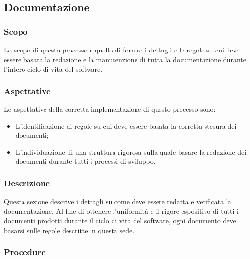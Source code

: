 \documentclass[../norme-di-progetto.tex]{subfiles}
\begin{document}
\subsection{Documentazione}
\subsubsection{Scopo}
Lo scopo di questo processo è quello di fornire i dettagli e le regole su cui deve essere basata la redazione e la manutenzione di tutta la documentazione durante l'intero ciclo di vita del software.
\subsubsection{Aspettative}
Le aspettative della corretta implementazione di questo processo sono:
\begin{itemize}
  \item L'identificazione di regole su cui deve essere basata la corretta stesura dei documenti;
  \item L'individuazione di una struttura rigorosa sulla quale basare la redazione dei documenti durante tutti i processi di sviluppo.
\end{itemize}
\subsubsection{Descrizione}
Questa sezione descrive i dettagli su come deve essere redatta e verificata la documentazione. Al fine di ottenere l'uniformità e il rigore espositivo di tutti i documenti prodotti durante il ciclo di vita del software, ogni documento deve basarsi sulle regole descritte in questa sede.
\subsubsection{Procedure}
\end{document}
